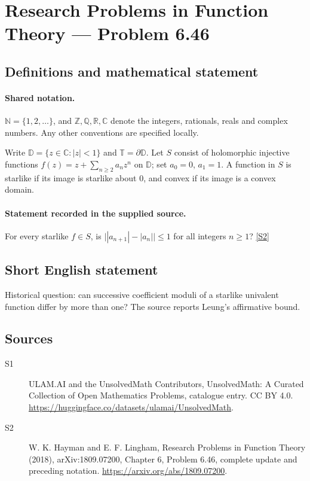 \documentclass[11pt]{article}
\newcommand{\sref}[2]{\hyperlink{source:#1:#2}{[S#2]}}
\begin{document}
\section{Research Problems in Function Theory — Problem 6.46}\label{statement}

\subsection{Definitions and mathematical statement}

\paragraph{Shared notation.}$\mathbb N=\{1,2,\ldots\}$, and $\mathbb Z,\mathbb Q,\mathbb R,\mathbb C$ denote the integers, rationals, reals and complex numbers. Any other conventions are specified locally.


Write $\mathbb D=\{z\in\mathbb C:|z|<1\}$ and $\mathbb T=\partial\mathbb D$. Let $S$ consist of holomorphic injective functions $f(z)=z+\sum_{n\ge2}a_nz^n$ on $\mathbb D$; set $a_0=0$, $a_1=1$. A function in $S$ is starlike if its image is starlike about $0$, and convex if its image is a convex domain.
\paragraph{Statement recorded in the supplied source.}
For every starlike $f\in S$, is $\big||a_{n+1}|-|a_n|\big|\le1$ for all integers $n\ge1$? \sref{statement}{2}
\subsection{Short English statement}
Historical question: can successive coefficient moduli of a starlike univalent function differ by more than one? The source reports Leung’s affirmative bound.
\subsection{Sources}
\begin{description}
\item[\hypertarget{source:statement:1}{S1}] ULAM.AI and the UnsolvedMath Contributors, UnsolvedMath: A Curated Collection of Open Mathematics Problems, catalogue entry. CC BY 4.0. \url{https://huggingface.co/datasets/ulamai/UnsolvedMath}.
\item[\hypertarget{source:statement:2}{S2}] W. K. Hayman and E. F. Lingham, Research Problems in Function Theory (2018), arXiv:1809.07200, Chapter 6, Problem 6.46, complete update and preceding notation. \url{https://arxiv.org/abs/1809.07200}.
\end{description}
\label{end:statement}
\end{document}
